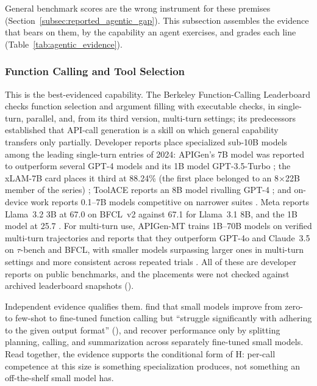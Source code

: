 General benchmark scores are the wrong instrument for these premises (Section~\ref{subsec:reported_agentic_gap}). This subsection assembles the evidence that bears on them, by the capability an agent exercises, and grades each line (Table~\ref{tab:agentic_evidence}).

\subsubsection{Function Calling and Tool Selection}
\label{subsubsec:agentic_ev_fc}

This is the best-evidenced capability. The Berkeley Function-Calling Leaderboard \citep{patil2025bfcl} checks function selection and argument filling with executable checks, in single-turn, parallel, and, from its third version, multi-turn settings; its predecessors \citep{patil2023gorilla,qin2024toolllm,li2023apibank} established that API-call generation is a skill on which general capability transfers only partially. Developer reports place specialized sub-10B models among the leading single-turn entries of 2024: APIGen's 7B model was reported to outperform several GPT-4 models and its 1B model GPT-3.5-Turbo \citep{liu2024apigen}; the xLAM-7B card places it third at 88.24\% (the first place belonged to an 8$\times$22B member of the series) \citep{zhang2024xlam}; ToolACE reports an 8B model rivalling GPT-4 \citep{liu2025toolace}; and on-device work reports 0.1--7B models competitive on narrower suites \citep{chen2024octopusv2,erdogan2024tinyagent,lin2024hammer,liu2024mobilellm}. Meta reports Llama~3.2 3B at 67.0 on BFCL~v2 against 67.1 for Llama~3.1 8B, and the 1B model at 25.7 \citep{meta2024llama32card}. For multi-turn use, APIGen-MT trains 1B--70B models on verified multi-turn trajectories and reports that they outperform GPT-4o and Claude~3.5 on $\tau$-bench and BFCL, with smaller models surpassing larger ones in multi-turn settings and more consistent across repeated trials \citep{prabhakar2025apigenmt}. All of these are developer reports on public benchmarks, and the placements were not checked against archived leaderboard snapshots (\evC).

Independent evidence qualifies them. \citet{kavathekar2025smallmodels} find that small models improve from zero- to few-shot to fine-tuned function calling but ``struggle significantly with adhering to the given output format'' (\evB), and \citet{shen2024weaktool} recover performance only by splitting planning, calling, and summarization across separately fine-tuned small models. Read together, the evidence supports the conditional form of H: per-call competence at this size is something specialization produces, not something an off-the-shelf small model has.


